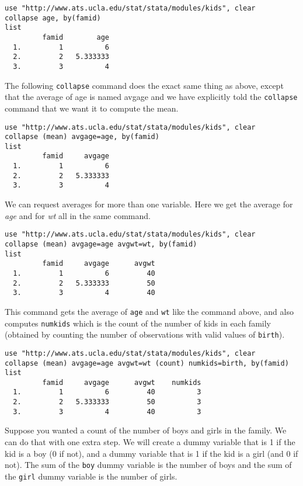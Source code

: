 \begin{lstlisting}
use "http://www.ats.ucla.edu/stat/stata/modules/kids", clear
collapse age, by(famid)
list
         famid        age
  1.         1          6
  2.         2   5.333333
  3.         3          4
\end{lstlisting}

The following \lstinline{collapse} command does the exact same thing as above, except that the average of age is named avgage and we have explicitly told the \lstinline{collapse} command that we want it to compute the mean.

\begin{lstlisting}
use "http://www.ats.ucla.edu/stat/stata/modules/kids", clear
collapse (mean) avgage=age, by(famid)
list
         famid     avgage
  1.         1          6
  2.         2   5.333333
  3.         3          4
\end{lstlisting}

We can request averages for more than one variable. Here we get the average for \textit{age} and for \textit{wt} all in the same command.

\begin{lstlisting}
use "http://www.ats.ucla.edu/stat/stata/modules/kids", clear
collapse (mean) avgage=age avgwt=wt, by(famid)
list
         famid     avgage      avgwt
  1.         1          6         40
  2.         2   5.333333         50
  3.         3          4         40
\end{lstlisting}

This command gets the average of \lstinline{age} and \lstinline{wt} like the command above, and also computes \lstinline{numkids} which is the count of the number of kids in each family (obtained by counting the number of observations with valid values of \lstinline{birth}).

\begin{lstlisting}
use "http://www.ats.ucla.edu/stat/stata/modules/kids", clear
collapse (mean) avgage=age avgwt=wt (count) numkids=birth, by(famid)
list
         famid     avgage      avgwt    numkids
  1.         1          6         40          3
  2.         2   5.333333         50          3
  3.         3          4         40          3
\end{lstlisting}

Suppose you wanted a count of the number of boys and girls in the family. We can do that with one extra step. We will create a dummy variable that is 1 if the kid is a boy (0 if not), and a dummy variable that is 1 if the kid is a girl (and 0 if not). The sum of the \lstinline{boy} dummy variable is the number of boys and the sum of the \lstinline{girl} dummy variable is the number of girls.

